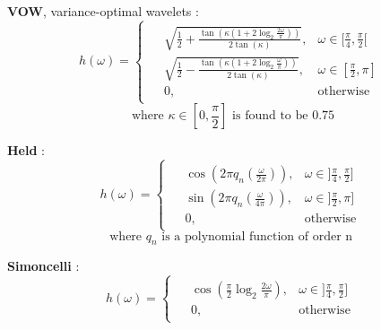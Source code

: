 \documentclass{InsightArticle}
\theoremstyle{definition}
\begin{document}
\noindent\begin{minipage}[t]{0.49\textwidth}
  \textbf{VOW}, variance-optimal wavelets \cite{pad_vow:_2014} :
\begin{equation*}
\label{VOW}
  h(\omega) =
    \begin{cases}
    \begin{aligned}
      &\sqrt{\frac{1}{2} + \frac{\tan(\kappa(1+2\log_2\frac{2\omega}{\pi}))}{2\tan(\kappa)}} , &\omega \in [\frac{\pi}{4} , \frac{\pi}{2} [ \\
      &\sqrt{\frac{1}{2} - \frac{\tan(\kappa(1+2\log_2\frac{\omega}{\pi}))}{2\tan(\kappa)}} , &\omega \in [\frac{\pi}{2} , \pi ] \\
      &0, &\text{otherwise}
    \end{aligned}
    \end{cases}
\end{equation*}
\begin{equation*}
  \text{where } \kappa \in [0, \frac{\pi}{2}] \text{ is found to be } 0.75
\end{equation*}
\newline
\end{minipage}
\noindent\begin{minipage}[t]{0.49\textwidth}
  \textbf{Held} \cite{held_steerable_2010} :
\begin{equation*}
\label{Held}
  h(\omega) =
    \begin{cases}
    \begin{aligned}
&\cos\left(2\pi q_n(\frac{\omega}{2\pi})\right) , &\omega \in ]\frac{\pi}{4} , \frac{\pi}{2} ] \\
  &\sin\left(2\pi q_n(\frac{\omega}{4\pi})\right) , &\omega \in ]\frac{\pi}{2} , \pi ] \\
      &0, &\text{otherwise}
    \end{aligned}
    \end{cases}
\end{equation*}
\begin{equation*}
  \text{where } q_n \text{ is a polynomial function of order n } %
\end{equation*}
\end{minipage}
\noindent\begin{minipage}[t]{0.49\textwidth}
  \textbf{Simoncelli} \cite{portilla_image_2000, simoncelli_steerable_1995} :
\begin{equation*}
\label{Simoncelli}
  h(\omega) =
    \begin{cases}
    \begin{aligned}
  &\cos\left(\frac{\pi}{2} \log_2\frac{2\omega}{\pi}\right) , &\omega \in ]\frac{\pi}{4} , \frac{\pi}{2} ] \\
  &0, &\text{otherwise}
    \end{aligned}
    \end{cases}
\end{equation*}
\end{minipage}
\end{document}
